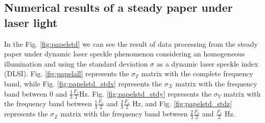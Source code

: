 \documentclass[review]{elsarticle}
\begin{document}
\subsection{Numerical results of a steady paper under laser light} 
\label{subsec:numericalpaper}
In the Fig. \ref{fig:papelstd} we can see the result of data processing from the steady
 paper under dynamic laser speckle phenomenon considering an homogeneous illumination and using the standard deviation $\sigma$ as a dynamic laser speckle index (DLSI). Fig. \ref{fig:papelall}
represents the $\sigma_T$ matrix with the complete frequency band, while Fig. \ref{fig:papelstd_stdx}
represents the $\sigma_X$ matrix with the frequency band between $0$ and $\frac{1}{3}\frac{F_s}{2}$Hz.
Fig. \ref{fig:papelstd_stdy} represents the $\sigma_Y$ matrix with the frequency band between $\frac{1}{3}\frac{F_s}{2}$ and $\frac{2}{3}\frac{F_s}{2}$ Hz, and Fig. \ref{fig:papelstd_stdz} 
represents the $\sigma_Z$ matrix with the frequency band between $\frac{2}{3}\frac{F_s}{2}$ and $\frac{F_s}{2}$ Hz.
\end{document}
